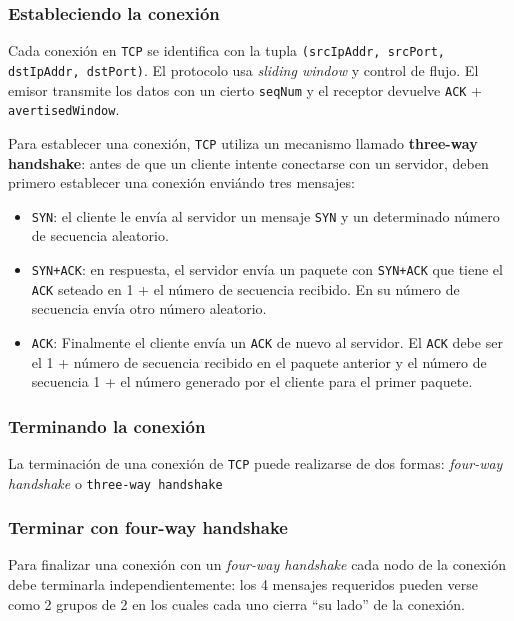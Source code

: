 \documentclass[]{article}
\begin{document}
\subsubsection{Estableciendo la conexión}

Cada conexión en \texttt{TCP} se identifica con la tupla \texttt{(srcIpAddr, srcPort, dstIpAddr, dstPort)}. El protocolo usa \emph{sliding window} y control de flujo. El emisor transmite los datos con un cierto \texttt{seqNum} y el receptor devuelve \texttt{ACK} + \texttt{avertisedWindow}.

Para establecer una conexión, \texttt{TCP} utiliza un mecanismo llamado \textbf{three-way handshake}: antes de que un cliente intente conectarse con un servidor, deben primero establecer una conexión enviándo tres mensajes:
\begin{itemize}
    \item \texttt{SYN}: el cliente le envía al servidor un mensaje \texttt{SYN} y un determinado número de secuencia aleatorio.
    \item \texttt{SYN+ACK}: en respuesta, el servidor envía un paquete con \texttt{SYN+ACK} que tiene el \texttt{ACK} seteado en 1 + el número de secuencia recibido. En su número de secuencia envía otro número aleatorio.
    \item \texttt{ACK}: Finalmente el cliente envía un \texttt{ACK} de nuevo al servidor. El \texttt{ACK} debe ser el 1 + número de secuencia recibido en el paquete anterior y el número de secuencia 1 + el número generado por el cliente para el primer paquete.
\end{itemize}


\subsubsection{Terminando la conexión}

La terminación de una conexión de \texttt{TCP} puede realizarse de dos formas: \emph{four-way handshake} o \texttt{three-way handshake}

\subsubsection{Terminar con four-way handshake}
Para finalizar una conexión con un \emph{four-way handshake} cada nodo de la conexión debe terminarla independientemente: los 4 mensajes requeridos pueden verse como 2 grupos de 2 en los cuales cada uno cierra ``su lado'' de la conexión.
\end{document}
